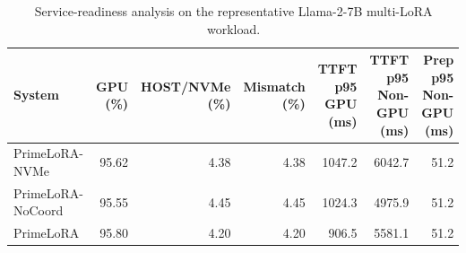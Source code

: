 \begin{table}[t]
\centering
\caption{Service-readiness analysis on the representative Llama-2-7B multi-LoRA workload.}
\label{tab:service_readiness}
\setlength{\tabcolsep}{2.4pt}
\renewcommand{\arraystretch}{1.10}
\begin{tabular}{lrrrrrr}
\hline
System & \shortstack{GPU\\(\%)} & \shortstack{HOST/NVMe\\(\%)} & \shortstack{Mismatch\\(\%)} & \shortstack{TTFT p95\\GPU (ms)} & \shortstack{TTFT p95\\Non-GPU (ms)} & \shortstack{Prep p95\\Non-GPU (ms)} \\
\hline
PrimeLoRA-NVMe & 95.62 & 4.38 & 4.38 & 1047.2 & 6042.7 & 51.2 \\
PrimeLoRA-NoCoord & 95.55 & 4.45 & 4.45 & 1024.3 & 4975.9 & 51.2 \\
PrimeLoRA & 95.80 & 4.20 & 4.20 & 906.5 & 5581.1 & 51.2 \\
\hline
\end{tabular}
\end{table}
